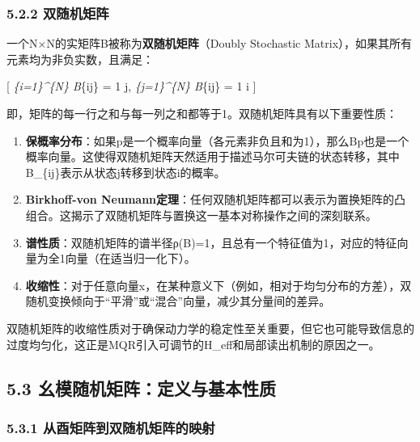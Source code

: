 \documentclass[
  12pt,
]{article}
\providecommand{\tightlist}{%
  \setlength{\itemsep}{0pt}\setlength{\parskip}{0pt}}
\begin{document}
\hypertarget{ux53ccux968fux673aux77e9ux9635}{%
\subsubsection{5.2.2 双随机矩阵}\label{ux53ccux968fux673aux77e9ux9635}}

一个N×N的实矩阵B被称为\textbf{双随机矩阵}（Doubly Stochastic
Matrix），如果其所有元素均为非负实数，且满足：

{[} \sum\emph{\{i=1\}\^{}\{N\} B}\{ij\} = 1 \quad \forall j,
\qquad \sum\emph{\{j=1\}\^{}\{N\} B}\{ij\} = 1 \quad \forall i {]}

即，矩阵的每一行之和与每一列之和都等于1。双随机矩阵具有以下重要性质：

\begin{enumerate}
\def\labelenumi{\arabic{enumi}.}
\tightlist
\item
  \textbf{保概率分布}：如果p是一个概率向量（各元素非负且和为1），那么Bp也是一个概率向量。这使得双随机矩阵天然适用于描述马尔可夫链的状态转移，其中B\_\{ij\}表示从状态j转移到状态i的概率。
\item
  \textbf{Birkhoff-von
  Neumann定理}：任何双随机矩阵都可以表示为置换矩阵的凸组合。这揭示了双随机矩阵与置换这一基本对称操作之间的深刻联系。
\item
  \textbf{谱性质}：双随机矩阵的谱半径ρ(B)=1，且总有一个特征值为1，对应的特征向量为全1向量（在适当归一化下）。
\item
  \textbf{收缩性}：对于任意向量x，在某种意义下（例如，相对于均匀分布的方差），双随机变换倾向于``平滑''或``混合''向量，减少其分量间的差异。
\end{enumerate}

双随机矩阵的收缩性质对于确保动力学的稳定性至关重要，但它也可能导致信息的过度均匀化，这正是MQR引入可调节的H\_eff和局部读出机制的原因之一。

\hypertarget{ux5e7aux6a21ux968fux673aux77e9ux9635ux5b9aux4e49ux4e0eux57faux672cux6027ux8d28}{%
\subsection{5.3
幺模随机矩阵：定义与基本性质}\label{ux5e7aux6a21ux968fux673aux77e9ux9635ux5b9aux4e49ux4e0eux57faux672cux6027ux8d28}}

\hypertarget{ux4eceux9149ux77e9ux9635ux5230ux53ccux968fux673aux77e9ux9635ux7684ux6620ux5c04}{%
\subsubsection{5.3.1
从酉矩阵到双随机矩阵的映射}\label{ux4eceux9149ux77e9ux9635ux5230ux53ccux968fux673aux77e9ux9635ux7684ux6620ux5c04}}
\end{document}
